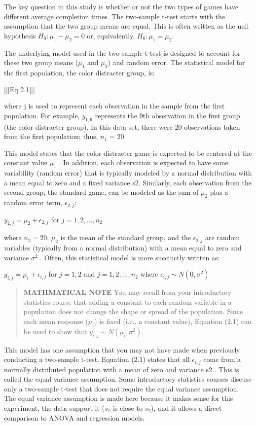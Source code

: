 \documentclass[
]{report}
\begin{document}
The key question in this study is whether or not the two types of games have different average completion times. The two-sample t-test starts with the assumption that the two group means are equal. This is often written as the null hypothesis \(H_0 : \mu_1 - \mu_2 = 0\) or, equivalently, \(H_0 : \mu_1 = \mu_2\).

The underlying model used in the two-sample t-test is designed to account for these two group means (\(\mu_1\) and \(\mu_2\)) and random error. The statistical model for the first population, the color distracter group, is:

{[}{[}{[}Eq 2.1{]}{]}{]}

where j is used to represent each observation in the sample from the first population. For example, \(y_{1, 9}\) represents the 9th observation in the first group (the color distracter group). In this data set, there were 20 observations taken from the first population; thus, \(n_1\) = 20.

This model states that the color distracter game is expected to be centered at the constant value \(\mu_1\) . In addition, each observation is expected to have some variability (random error) that is typically modeled by a normal distribution with a mean equal to zero and a fixed variance s2. Similarly, each observation from the second group, the standard game, can be modeled as the sum of \(\mu_2\) plus a random error term, \(\epsilon_{2, j}\):

\(y_{2, j} = \mu_2 + \epsilon_{2, j}\) for \(j = 1, 2, ... ,n_2\)

where \(n_2 = 20\), \(\mu_2\) is the mean of the standard group, and the \(\epsilon_{2, j}\) are random variables (typically from a
normal distribution) with a mean equal to zero and variance \(\sigma^2\) . Often, this statistical model is more succinctly written as:

\(y_{i, j} = \mu_i + \epsilon_{i, j}\) for \(j = 1, 2\) and \(j = 1, 2, ... ,n_2\) where \(\epsilon_{i, j} \sim N(0,\sigma^2)\)

\begin{quote}
\textbf{MATHMATICAL NOTE}
You may recall from your introductory statistics course that adding a constant to each random variable in a population does not change the shape or spread of the population. Since each mean response (\(\mu_i\)) is fixed (i.e., a constant value), Equation (2.1) can be used to show that \(y_{i, j} \sim N(\mu_i,\sigma^2)\).
\end{quote}

This model has one assumption that you may not have made when previously conducting a two-sample t-test. Equation (2.1) states that all \(\epsilon_{i, j}\) come from a normally distributed population with a mean of zero and
variance s2 . This is called the equal variance assumption. Some introductory statistics courses discuss only a two-sample t-test that does not require the equal variance assumption. The equal variance assumption is
made here because it makes sense for this experiment, the data support it (\(s_1\) is close to \(s_2\)), and it allows a direct comparison to ANOVA and regression models.
\end{document}
